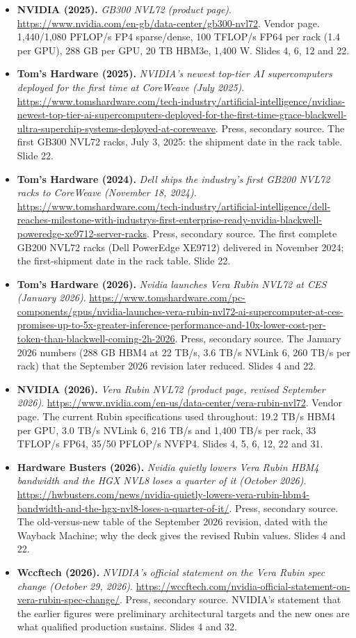\begin{itemize}[leftmargin=1.2em,itemsep=3pt]
\item \textbf{NVIDIA (2025).} \textit{GB300 NVL72 (product page)}. \url{https://www.nvidia.com/en-gb/data-center/gb300-nvl72}. Vendor page. 1,440/1,080 PFLOP/s FP4 sparse/dense, 100 TFLOP/s FP64 per rack (1.4 per GPU), 288 GB per GPU, 20 TB HBM3e, 1,400 W. Slides 4, 6, 12 and 22.
\item \textbf{Tom's Hardware (2025).} \textit{NVIDIA's newest top-tier AI supercomputers deployed for the first time at CoreWeave (July 2025)}. \url{https://www.tomshardware.com/tech-industry/artificial-intelligence/nvidias-newest-top-tier-ai-supercomputers-deployed-for-the-first-time-grace-blackwell-ultra-superchip-systems-deployed-at-coreweave}. Press, secondary source. The first GB300 NVL72 racks, July 3, 2025: the shipment date in the rack table. Slide 22.
\item \textbf{Tom's Hardware (2024).} \textit{Dell ships the industry's first GB200 NVL72 racks to CoreWeave (November 18, 2024)}. \url{https://www.tomshardware.com/tech-industry/artificial-intelligence/dell-reaches-milestone-with-industrys-first-enterprise-ready-nvidia-blackwell-poweredge-xe9712-server-racks}. Press, secondary source. The first complete GB200 NVL72 racks (Dell PowerEdge XE9712) delivered in November 2024; the first-shipment date in the rack table. Slide 22.
\item \textbf{Tom's Hardware (2026).} \textit{Nvidia launches Vera Rubin NVL72 at CES (January 2026)}. \url{https://www.tomshardware.com/pc-components/gpus/nvidia-launches-vera-rubin-nvl72-ai-supercomputer-at-ces-promises-up-to-5x-greater-inference-performance-and-10x-lower-cost-per-token-than-blackwell-coming-2h-2026}. Press, secondary source. The January 2026 numbers (288 GB HBM4 at 22 TB/s, 3.6 TB/s NVLink 6, 260 TB/s per rack) that the September 2026 revision later reduced. Slides 4 and 22.
\item \textbf{NVIDIA (2026).} \textit{Vera Rubin NVL72 (product page, revised September 2026)}. \url{https://www.nvidia.com/en-us/data-center/vera-rubin-nvl72}. Vendor page. The current Rubin specifications used throughout: 19.2 TB/s HBM4 per GPU, 3.0 TB/s NVLink 6, 216 TB/s and 1,400 TB/s per rack, 33 TFLOP/s FP64, 35/50 PFLOP/s NVFP4. Slides 4, 5, 6, 12, 22 and 31.
\item \textbf{Hardware Busters (2026).} \textit{Nvidia quietly lowers Vera Rubin HBM4 bandwidth and the HGX NVL8 loses a quarter of it (October 2026)}. \url{https://hwbusters.com/news/nvidia-quietly-lowers-vera-rubin-hbm4-bandwidth-and-the-hgx-nvl8-loses-a-quarter-of-it/}. Press, secondary source. The old-versus-new table of the September 2026 revision, dated with the Wayback Machine; why the deck gives the revised Rubin values. Slides 4 and 22.
\item \textbf{Wccftech (2026).} \textit{NVIDIA's official statement on the Vera Rubin spec change (October 29, 2026)}. \url{https://wccftech.com/nvidia-official-statement-on-vera-rubin-spec-change/}. Press, secondary source. NVIDIA's statement that the earlier figures were preliminary architectural targets and the new ones are what qualified production sustains. Slides 4 and 32.
\end{itemize}
